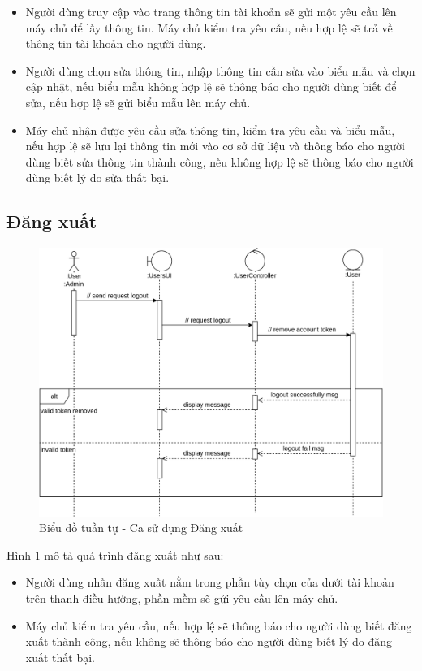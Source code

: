 \documentclass[./../main.tex]{subfiles}
\begin{document}
\begin{itemize}
    \item Người dùng truy cập vào trang thông tin tài khoản sẽ gửi một yêu cầu lên máy chủ để lấy thông tin. Máy chủ kiểm tra yêu cầu, nếu hợp lệ sẽ trả về thông tin tài khoản cho người dùng.
    \item Người dùng chọn sửa thông tin, nhập thông tin cần sửa vào biểu mẫu và chọn cập nhật, nếu biểu mẫu không hợp lệ sẽ thông báo cho người dùng biết để sửa, nếu hợp lệ sẽ gửi biểu mẫu lên máy chủ.
    \item Máy chủ nhận được yêu cầu sửa thông tin, kiểm tra yêu cầu và biểu mẫu, nếu hợp lệ sẽ lưu lại thông tin mới vào cơ sở dữ liệu và thông báo cho người dùng biết sửa thông tin thành công, nếu không hợp lệ sẽ thông báo cho người dùng biết lý do sửa thất bại.
\end{itemize}


\subsection{Đăng xuất}
\begin{figure}[H]
	\centering
	\includegraphics[width=\linewidth]{./img/uc5.png}
	\caption{\label{tab:seq-uc5}Biểu đồ tuần tự - Ca sử dụng Đăng xuất}
\end{figure}
Hình \ref{tab:seq-uc5} mô tả quá trình đăng xuất như sau:
\begin{itemize}
    \item Người dùng nhấn đăng xuất nằm trong phần tùy chọn của dưới tài khoản trên thanh điều hướng, phần mềm sẽ gửi yêu cầu lên máy chủ.
    \item Máy chủ kiểm tra yêu cầu, nếu hợp lệ sẽ thông báo cho người dùng biết đăng xuất thành công, nếu không sẽ thông báo cho người dùng biết lý do đăng xuất thất bại.
\end{itemize}
\end{document}
